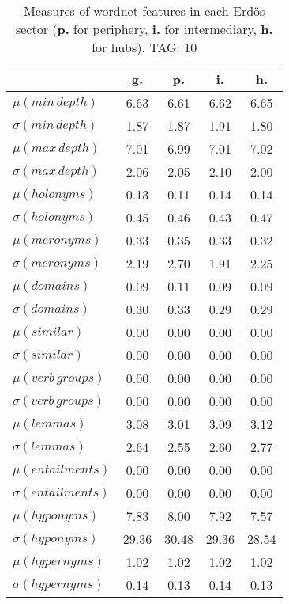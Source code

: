 \begin{table}[h!]
\begin{center}
\begin{tabular}{| l | c | c | c | c |}\hline
 & g. & p. & i. & h. \\\hline
$\mu(min\,depth)$ & 6.63  & 6.61  & 6.62  & 6.65 \\\hline
$\sigma(min\,depth)$ & 1.87  & 1.87  & 1.91  & 1.80 \\\hline
$\mu(max\,depth)$ & 7.01  & 6.99  & 7.01  & 7.02 \\\hline
$\sigma(max\,depth)$ & 2.06  & 2.05  & 2.10  & 2.00 \\\hline
$\mu(holonyms)$ & 0.13  & 0.11  & 0.14  & 0.14 \\\hline
$\sigma(holonyms)$ & 0.45  & 0.46  & 0.43  & 0.47 \\\hline
$\mu(meronyms)$ & 0.33  & 0.35  & 0.33  & 0.32 \\\hline
$\sigma(meronyms)$ & 2.19  & 2.70  & 1.91  & 2.25 \\\hline
$\mu(domains)$ & 0.09  & 0.11  & 0.09  & 0.09 \\\hline
$\sigma(domains)$ & 0.30  & 0.33  & 0.29  & 0.29 \\\hline
$\mu(similar)$ & 0.00  & 0.00  & 0.00  & 0.00 \\\hline
$\sigma(similar)$ & 0.00  & 0.00  & 0.00  & 0.00 \\\hline
$\mu(verb\,groups)$ & 0.00  & 0.00  & 0.00  & 0.00 \\\hline
$\sigma(verb\,groups)$ & 0.00  & 0.00  & 0.00  & 0.00 \\\hline
$\mu(lemmas)$ & 3.08  & 3.01  & 3.09  & 3.12 \\\hline
$\sigma(lemmas)$ & 2.64  & 2.55  & 2.60  & 2.77 \\\hline
$\mu(entailments)$ & 0.00  & 0.00  & 0.00  & 0.00 \\\hline
$\sigma(entailments)$ & 0.00  & 0.00  & 0.00  & 0.00 \\\hline
$\mu(hyponyms)$ & 7.83  & 8.00  & 7.92  & 7.57 \\\hline
$\sigma(hyponyms)$ & 29.36  & 30.48  & 29.36  & 28.54 \\\hline
$\mu(hypernyms)$ & 1.02  & 1.02  & 1.02  & 1.02 \\\hline
$\sigma(hypernyms)$ & 0.14  & 0.13  & 0.14  & 0.13 \\\hline
\end{tabular}
\caption{Measures of wordnet features in each Erd\"os sector ({{\bf p.}} for periphery, {{\bf i.}} for intermediary, {{\bf h.}} for hubs). TAG: 10}
\end{center}
\end{table}